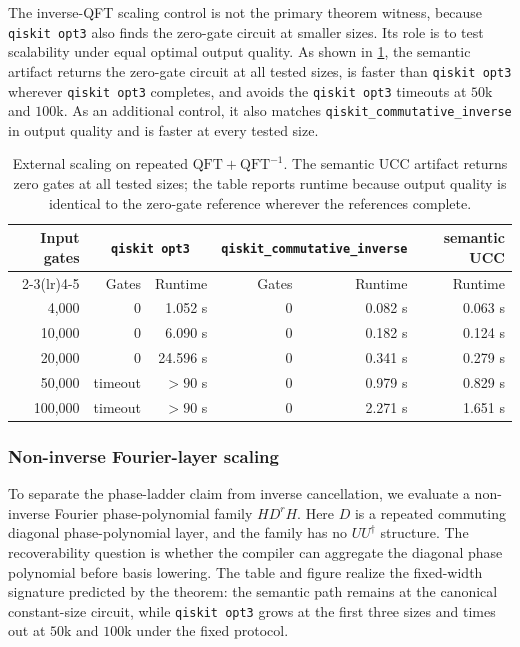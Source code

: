 \documentclass[11pt]{article}
\begin{document}
The inverse-QFT scaling control is not the primary theorem witness, because
\texttt{qiskit opt3} also finds the zero-gate circuit at smaller sizes. Its role
is to test scalability under equal optimal output quality. As shown in
\cref{tab:qft-inverse-external-scaling}, the semantic artifact returns the
zero-gate circuit at all tested sizes, is faster than \texttt{qiskit opt3}
wherever \texttt{qiskit opt3} completes, and avoids the \texttt{qiskit opt3}
timeouts at $50$k and $100$k. As an additional control, it also matches
\texttt{qiskit\_commutative\_inverse} in output quality and is faster at every
tested size.

\begin{table}[h]
\centering
\begin{tabular}{rrrrrr}
\toprule
Input gates & \multicolumn{2}{c}{\texttt{qiskit opt3}} & \multicolumn{2}{c}{\texttt{qiskit\_commutative\_inverse}} & semantic UCC \\
\cmidrule(lr){2-3}\cmidrule(lr){4-5}
 & Gates & Runtime & Gates & Runtime & Runtime \\
\midrule
4{,}000 & 0 & 1.052 s & 0 & 0.082 s & 0.063 s \\
10{,}000 & 0 & 6.090 s & 0 & 0.182 s & 0.124 s \\
20{,}000 & 0 & 24.596 s & 0 & 0.341 s & 0.279 s \\
50{,}000 & timeout & $>90$ s & 0 & 0.979 s & 0.829 s \\
100{,}000 & timeout & $>90$ s & 0 & 2.271 s & 1.651 s \\
\bottomrule
\end{tabular}
\caption{External scaling on repeated $\mathrm{QFT}+\mathrm{QFT}^{-1}$. The semantic UCC artifact returns zero gates at all tested sizes; the table reports runtime because output quality is identical to the zero-gate reference wherever the references complete.}
\label{tab:qft-inverse-external-scaling}
\end{table}

\subsubsection{Non-inverse Fourier-layer scaling}

To separate the phase-ladder claim from inverse cancellation, we evaluate a
non-inverse Fourier phase-polynomial family $H D^r H$. Here $D$ is a repeated
commuting diagonal phase-polynomial layer, and the family has no $U U^\dagger$
structure. The recoverability question is whether the compiler can aggregate
the diagonal phase polynomial before basis lowering.
The table and figure realize the fixed-width signature predicted by the theorem:
the semantic path remains at the canonical constant-size circuit, while
\texttt{qiskit opt3} grows at the first three sizes and times out at $50$k and
$100$k under the fixed protocol.
\end{document}
